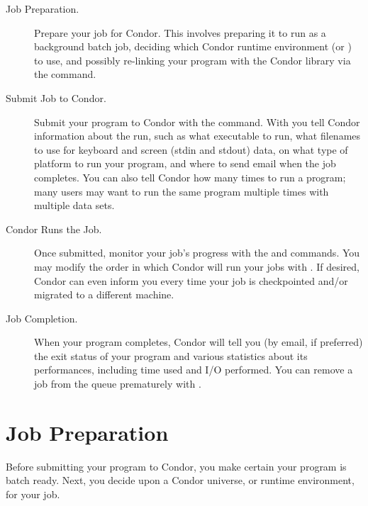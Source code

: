 \begin{description}

\item[Job Preparation.]Prepare your job for
Condor. This involves preparing it to run as a background batch job,
deciding which Condor runtime environment (or ) to use,
and possibly re-linking your program with the Condor library via the
 command. 

\item[Submit Job to Condor.]Submit your program to Condor with
the  command.
With  you tell Condor
information about the run, such as what executable to run, what
filenames to use for keyboard and screen (stdin and stdout) data,
on what type of platform to run your program, and
where to send email when the job completes. You can also tell Condor how
many times to run a program; many users may want to run the same program
multiple times with multiple data sets.

\item[Condor Runs the Job.]Once submitted, monitor your job's
progress with the 
and  commands.
You may modify the order in which Condor will run your jobs with
. If desired, Condor can even inform you every time your job
is checkpointed and/or migrated to a different machine. 

\item[Job Completion.]When your program completes, Condor will tell you
(by email, if preferred) the exit status of your program and various
statistics about its performances, including time used and I/O performed.
You can remove a job from the
queue prematurely with . 

\end{description}  %


\section{\label{sec:job-preparation}Job Preparation}

Before submitting your program to Condor, you make certain
your program is batch ready.  Next, you decide upon a Condor
universe, or runtime environment, for your job.

